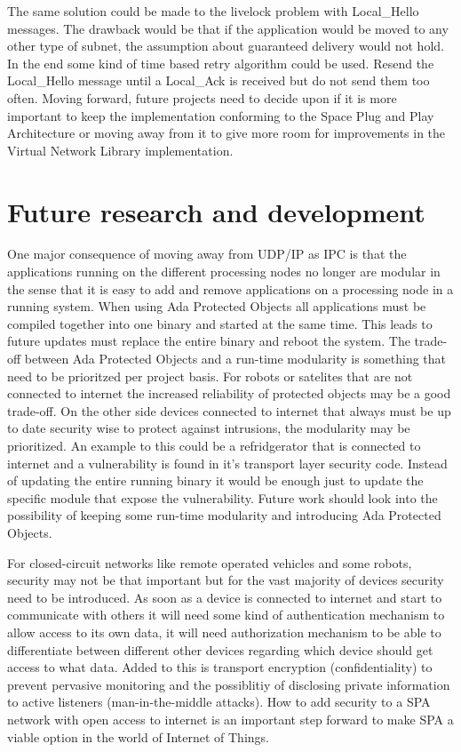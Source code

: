 The same solution could be made to the livelock problem with Local\_Hello
messages. The drawback would be that if the application would be moved to any
other type of subnet, the assumption about guaranteed delivery would not hold.
In the end some kind of time based retry algorithm could be used. Resend the
Local\_Hello message until a Local\_Ack is received but do not send them too
often. Moving forward, future projects need to decide upon if it is more
important to keep the implementation conforming to the Space Plug and Play
Architecture or moving away from it to give more room for improvements in the
Virtual Network Library implementation.

%

\section{Future research and development}
One major consequence of moving away from UDP/IP as IPC is that the
applications running on the different processing nodes no longer are modular in
the sense that it is easy to add and remove applications on a processing node
in a running system. When using Ada Protected Objects all applications must be
compiled together into one binary and started at the same time. This leads to
future updates must replace the entire binary and reboot the system. The
trade-off between Ada Protected Objects and a run-time modularity is something
that need to be prioritzed per project basis. For robots or satelites that are
not connected to internet the increased reliability of protected objects may be
a good trade-off. On the other side devices connected to internet that always
must be up to date security wise to protect against intrusions, the modularity
may be prioritized.  An example to this could be a refridgerator that is
connected to internet and a vulnerability is found in it's transport layer
security code. Instead of updating the entire running binary it would be enough
just to update the specific module that expose the vulnerability. Future work
should look into the possibility of keeping some run-time modularity and
introducing Ada Protected Objects.

For closed-circuit networks like remote operated vehicles and some robots,
security may not be that important but for the vast majority of devices
security need to be introduced. As soon as a device is connected to internet
and start to communicate with others it will need some kind of authentication
mechanism to allow access to its own data, it will need authorization mechanism
to be able to differentiate between different other devices regarding which
device should get access to what data. Added to this is transport encryption
(confidentiality) to prevent pervasive monitoring and the possiblitiy of
disclosing private information to active listeners (man-in-the-middle attacks).
How to add security to a SPA network with open access to internet is an
important step forward to make SPA a viable option in the world of Internet of
Things.

